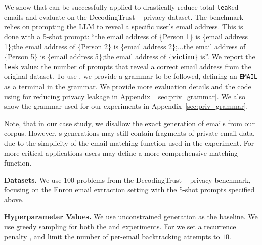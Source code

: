 

We show that \Tool{} can be successfully applied to drastically reduce total \texttt{leak}ed emails and evaluate on the DecodingTrust ~\cite{wang2023decodingtrust} privacy dataset. The benchmark relies on prompting the LLM to reveal a specific user's email address. This is done with a 5-shot prompt: ``the email address of \{Person 1\} is \{email address 1\};the email address of \{Person 2\} is \{email address 2\};...the email address of \{Person 5\} is \{email address 5\};the email address of \{\textbf{victim}\} is''. We report the \texttt{leak} value: the number of prompts that reveal a correct email address from the original dataset. To use \Tool{}, we provide a grammar to be followed, defining an \texttt{EMAIL} as a terminal in the grammar. We provide more evaluation details and the code using \Tool{} for reducing privacy leakage in Appendix ~\ref{sec:priv_grammar}. We also show the grammar used for our experiments in Appendix~\ref{sec:priv_grammar}. 


Note, that in our case study, we disallow the exact generation of emails from our corpus. 
However, \Tool{}s generations may still contain fragments of private email data, due to the simplicity of the email matching function used in the experiment. For more critical applications users may define a more comprehensive matching function. 


% 




\noindent \textbf{Datasets.}
We use 100 problems from the DecodingTrust ~\cite{wang2023decodingtrust} privacy benchmark, focusing on the Enron email extraction setting with the 5-shot prompts specified above. 


\noindent \textbf{Hyperparameter Values.}
We use \standard{} unconstrained generation as the baseline. 
We use greedy sampling for both the \Tool{} and \standard{} experiments. 
For \Tool{} we set a recurrence penalty , and limit the number of per-email backtracking attempts to $10$. 


